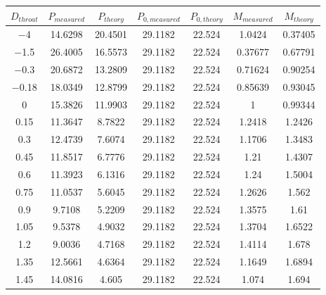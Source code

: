\begin{tabular}{ccccccc}
\toprule
$D_{throat}$ & $P_{measured}$ & $P_{theory}$ & $P_{0,measured}$ & $P_{0,theory}$ & $M_{measured}$ & $M_{theory}$ \\
\midrule
\num{-4} & \num{14.6298} & \num{20.4501} & \num{29.1182} & \num{22.524} & \num{1.0424} & \num{0.37405} \\ 
\num{-1.5} & \num{26.4005} & \num{16.5573} & \num{29.1182} & \num{22.524} & \num{0.37677} & \num{0.67791} \\ 
\num{-0.3} & \num{20.6872} & \num{13.2809} & \num{29.1182} & \num{22.524} & \num{0.71624} & \num{0.90254} \\ 
\num{-0.18} & \num{18.0349} & \num{12.8799} & \num{29.1182} & \num{22.524} & \num{0.85639} & \num{0.93045} \\ 
\num{0} & \num{15.3826} & \num{11.9903} & \num{29.1182} & \num{22.524} & \num{1} & \num{0.99344} \\ 
\num{0.15} & \num{11.3647} & \num{8.7822} & \num{29.1182} & \num{22.524} & \num{1.2418} & \num{1.2426} \\ 
\num{0.3} & \num{12.4739} & \num{7.6074} & \num{29.1182} & \num{22.524} & \num{1.1706} & \num{1.3483} \\ 
\num{0.45} & \num{11.8517} & \num{6.7776} & \num{29.1182} & \num{22.524} & \num{1.21} & \num{1.4307} \\ 
\num{0.6} & \num{11.3923} & \num{6.1316} & \num{29.1182} & \num{22.524} & \num{1.24} & \num{1.5004} \\ 
\num{0.75} & \num{11.0537} & \num{5.6045} & \num{29.1182} & \num{22.524} & \num{1.2626} & \num{1.562} \\ 
\num{0.9} & \num{9.7108} & \num{5.2209} & \num{29.1182} & \num{22.524} & \num{1.3575} & \num{1.61} \\ 
\num{1.05} & \num{9.5378} & \num{4.9032} & \num{29.1182} & \num{22.524} & \num{1.3704} & \num{1.6522} \\ 
\num{1.2} & \num{9.0036} & \num{4.7168} & \num{29.1182} & \num{22.524} & \num{1.4114} & \num{1.678} \\ 
\num{1.35} & \num{12.5661} & \num{4.6364} & \num{29.1182} & \num{22.524} & \num{1.1649} & \num{1.6894} \\ 
\num{1.45} & \num{14.0816} & \num{4.605} & \num{29.1182} & \num{22.524} & \num{1.074} & \num{1.694} \\ 
\bottomrule
\end{tabular}